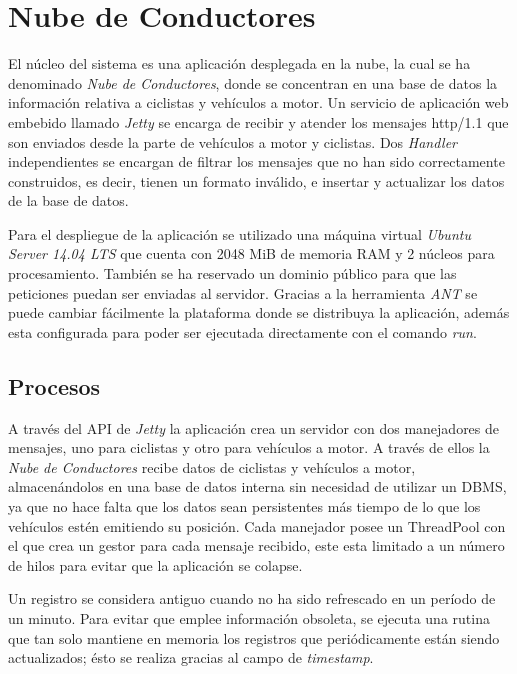 \section{Nube de Conductores}\label{section:NubeConductores}
El núcleo del sistema es una aplicación desplegada en la nube, la cual se ha
denominado \emph{Nube de Conductores}, donde se concentran en una base de datos
la información relativa a ciclistas y vehículos a motor. Un servicio de aplicación
web embebido llamado \emph{Jetty} se encarga de recibir y atender los mensajes
\Gls{http/1.1} que son enviados desde la parte de vehículos a motor y ciclistas.
Dos \emph{Handler} independientes se encargan de filtrar los mensajes que no han
sido correctamente construidos, es decir, tienen un formato inválido, e insertar
y actualizar los datos de la base de datos.

Para el despliegue de la aplicación se utilizado una máquina virtual
\emph{Ubuntu Server 14.04 LTS} que cuenta con 2048 MiB de memoria RAM y 2 n\'ucleos
 para procesamiento. También se ha reservado un dominio público para que las peticiones
 puedan ser enviadas al servidor. Gracias a la herramienta \emph{ANT} se puede cambiar
 fácilmente la plataforma donde se distribuya la aplicación, además esta configurada para
 poder ser ejecutada directamente con el comando \emph{run}.


\subsection{Procesos}\label{ssection:procesos}
A través del API de \emph{Jetty} la aplicación crea un servidor con dos manejadores
de mensajes, uno para ciclistas y otro para vehículos a motor. A través de ellos la
\emph{Nube de Conductores} recibe datos de ciclistas y vehículos a motor, almacenándolos
en una base de datos interna sin necesidad de utilizar un DBMS, ya que no hace falta
que los datos sean persistentes más tiempo de lo que los vehículos estén emitiendo
su posición. Cada manejador posee un ThreadPool con el que crea un gestor para cada
mensaje recibido, este esta limitado a un número de hilos para evitar que la aplicación
se colapse.

Un registro se considera antiguo cuando no ha sido refrescado en un período de un
minuto. Para evitar que emplee información obsoleta, se ejecuta una rutina que tan
solo mantiene en memoria los registros que periódicamente están siendo actualizados;
ésto se realiza gracias al campo de \emph{timestamp}.


